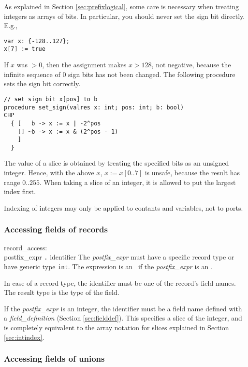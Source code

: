 As explained in Section \ref{sec:prefixlogical}, some care is necessary
when treating integers as arrays of bits. In particular, you should
never set the sign bit directly. E.g.,
\begin{verbatim}
var x: {-128..127};
x[7] := true
\end{verbatim}
If $x$ was $>0$, then the assignment makes $x>128$, not negative, because
the infinite sequence of $0$ sign bits has not been changed. The following
procedure sets the sign bit correctly.
\begin{verbatim}
// set sign bit x[pos] to b
procedure set_sign(valres x: int; pos: int; b: bool)
CHP
  { [   b -> x := x | -2^pos
    [] ~b -> x := x & (2^pos - 1)
    ]
  }
\end{verbatim}
The value of a slice is obtained by treating the specified bits as
an unsigned integer. Hence, with the above $x$, $x:=x[0..7]$ is
unsafe, because the result has range $0..255$. When taking a slice
of an integer, it is allowed to put the largest index first.

Indexing of integers may only be applied to contants and variables,
not to ports.

\subsubsection{Accessing fields of records}\label{sec:recordaccess}

\grammarstart
record\_access: \\
      \>postfix\_expr {\tt{}.} identifier
\grammarend
The {\it{}postfix\_expr} must have a specific record type or have generic
type {\tt{}int}. The expression is an \lvalue\ if the {\it{}postfix\_expr} is
an \lvalue.

In case of a record type, the identifier
must be one of the record's field names. The result type is the type of
the field.

If the {\it{}postfix\_expr} is an integer, the identifier must be a field
name defined with a {\it{}field\_definition} (Section \ref{sec:fielddef}). This
specifies a slice of the integer, and is completely equivalent to the
array notation for slices explained in Section \ref{sec:intindex}.

\subsubsection{Accessing fields of unions}\label{sec:unionaccess}

